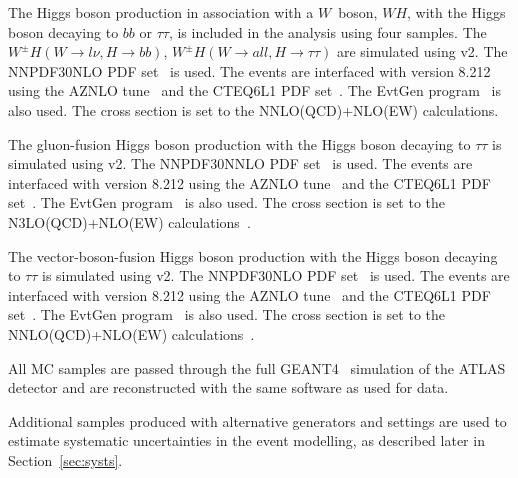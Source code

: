 The Higgs boson production in association with a $W$\ boson, $WH$, with the Higgs boson decaying to $bb$ or $\tau\tau$, is included in the analysis using four samples. The $W^{\pm}H(W\rightarrow l \nu, H\rightarrow bb)$, $W^{\pm}H(W\rightarrow all,H\rightarrow \tau\tau)$ are simulated using \POWHEGBOX v2. The NNPDF30NLO PDF set~\cite{NNPDF} is used. The events are interfaced with  version 8.212 using the AZNLO tune~\cite{AZNLOtune} and the CTEQ6L1 PDF set~\cite{CTEQ6L1}. The EvtGen program~\cite{EvtGen} is also used. The cross section is set to the NNLO(QCD)+NLO(EW) calculations.

The gluon-fusion Higgs boson production with the Higgs boson decaying to $\tau\tau$ is simulated using \POWHEGBOX v2. The NNPDF30NNLO PDF set~\cite{NNPDF} is used. The events are interfaced with  version 8.212 using the AZNLO tune~\cite{AZNLOtune} and the CTEQ6L1 PDF set~\cite{CTEQ6L1}. The EvtGen program~\cite{EvtGen} is also used. The cross section is set to the N3LO(QCD)+NLO(EW) calculations~\cite{Hxsec}.%

The vector-boson-fusion Higgs boson production with the Higgs boson decaying to $\tau\tau$ is simulated using \POWHEGBOX v2. The NNPDF30NLO PDF set~\cite{NNPDF} is used. The events are interfaced with  version 8.212 using the AZNLO tune~\cite{AZNLOtune} and the CTEQ6L1 PDF set~\cite{CTEQ6L1}. The EvtGen program~\cite{EvtGen} is also used. The cross section is set to the NNLO(QCD)+NLO(EW) calculations~\cite{Hxsec}. %


All MC samples are passed through the full GEANT4~\cite{Geant4,ATLASSIM} simulation of the ATLAS detector and are reconstructed with the same software as used for data.

Additional samples produced with alternative generators and settings are used to estimate systematic uncertainties in the event modelling, as described later in Section~\ref{sec:systs}.
